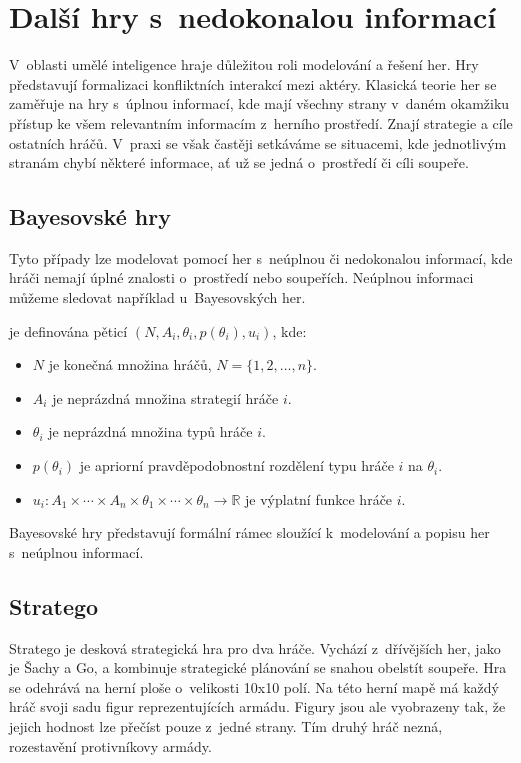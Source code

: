 \section{Další hry s~nedokonalou informací}\label{sec:dalsi-hry-s-nedokonalou-informaci}
V~oblasti umělé inteligence hraje důležitou roli modelování a řešení her.
Hry představují formalizaci konfliktních interakcí mezi aktéry.
Klasická teorie her se zaměřuje na hry s~úplnou informací, kde mají všechny strany v~daném okamžiku přístup ke všem relevantním informacím z~herního prostředí.
Znají strategie a cíle ostatních hráčů.
V~praxi se však častěji setkáváme se situacemi, kde jednotlivým stranám chybí některé informace, ať už se jedná o~prostředí či cíli soupeře.

\subsection{Bayesovské hry}
Tyto případy lze modelovat pomocí her s~neúplnou či nedokonalou informací, kde hráči nemají úplné znalosti o~prostředí nebo soupeřích.
Neúplnou informaci můžeme sledovat například u~Bayesovských her.

\begin{definition}
\cite{Y_Narahari} je definována pěticí $(N, A_i, \theta_i, p(\theta_i), u_i)$, kde:

\begin{itemize}
\item $N$ je konečná množina hráčů, $N = \{1, 2, \ldots, n\}$.
\item $A_i$ je neprázdná množina strategií hráče $i$.
\item $\theta_i$ je neprázdná množina typů hráče $i$.
\item $p(\theta_i)$ je apriorní pravděpodobnostní rozdělení typu hráče $i$ na $\theta_i$.
\item $u_i: A_1 \times \cdots \times A_n \times \theta_1 \times \cdots \times \theta_n \rightarrow \mathbb{R}$ je výplatní funkce hráče $i$.
\end{itemize}
\end{definition}

Bayesovské hry představují formální rámec sloužící k~modelování a popisu her s~neúplnou informací.

\subsection{Stratego}\label{subsec:stratego}
Stratego je desková strategická hra pro dva hráče.
Vychází z~dřívějších her, jako je Šachy a Go, a kombinuje strategické plánování se snahou obelstít soupeře.
Hra se odehrává na herní ploše o~velikosti 10x10 polí.
Na této herní mapě má každý hráč svoji sadu figur reprezentujících armádu.
Figury jsou ale vyobrazeny tak, že jejich hodnost lze přečíst pouze z~jedné strany.
Tím druhý hráč nezná, rozestavění protivníkovy armády.

